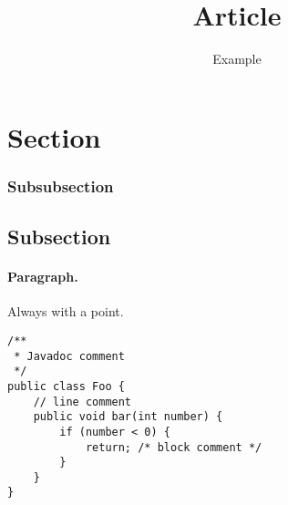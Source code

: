 \documentclass{seal_article}
\title{Article}
\subtitle{Example}
\begin{document}
\maketitle

\section{Section}
%
\subsubsection{Subsubsection}

\subsection{Subsection}
%
\paragraph{Paragraph.} Always with a point.

\begin{lstlisting}[caption=An example code snippet]
/**
 * Javadoc comment
 */
public class Foo {
	// line comment
	public void bar(int number) {
		if (number < 0) {
			return; /* block comment */
		}
	}
}
\end{lstlisting}



\end{document}
